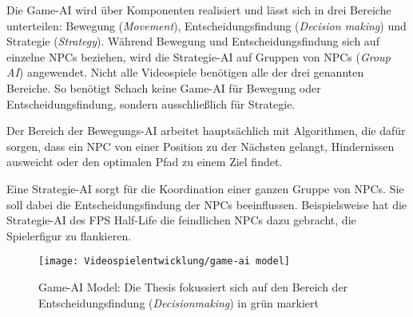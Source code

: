 Die Game-AI wird \"{u}ber Komponenten realisiert und l\"{a}sst sich in drei Bereiche unterteilen: Bewegung (\textit{Movement}), Entscheidungsfindung (\textit{Decision making}) und Strategie (\textit{Strategy}). W\"{a}hrend Bewegung und Entscheidungsfindung sich auf einzelne NPCs beziehen, wird die Strategie-AI auf Gruppen von NPCs (\textit{Group AI}) angewendet. Nicht alle Videospiele ben\"{o}tigen alle der drei genannten Bereiche. So ben\"{o}tigt Schach keine Game-AI f\"{u}r Bewegung oder Entscheidungsfindung, sondern ausschlie\ss{}lich f\"{u}r Strategie.

Der Bereich der Bewegungs-AI arbeitet haupts\"{a}chlich mit Algorithmen, die daf\"{u}r sorgen, dass ein NPC von einer Position zu der N\"{a}chsten gelangt, Hindernissen ausweicht oder den optimalen Pfad zu einem Ziel findet.

Eine Strategie-AI sorgt f\"{u}r die Koordination einer ganzen Gruppe von NPCs. Sie soll dabei die Entscheidungsfindung der NPCs beeinflussen. Beispielsweise hat die Strategie-AI des FPS Half-Life die feindlichen NPCs dazu gebracht, die Spielerfigur zu flankieren.

\begin{figure}[h]
  \centering
  \texttt{[image: Videospielentwicklung/game-ai model]}
	\captionsetup{justification=justified, format=plain}
  \caption{Game-AI Model: Die Thesis fokussiert sich auf den Bereich der Entscheidungsfindung (\textit{Decisionmaking}) in gr\"{u}n markiert}
  \label{fig:game-ai model}
\end{figure}